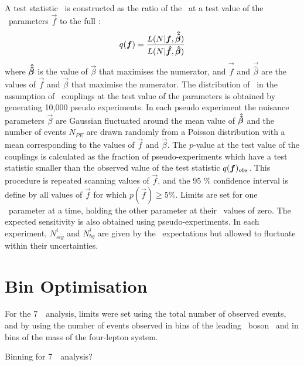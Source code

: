 A test statistic \teststat\ is constructed as the ratio of the \maxprofilellh\
at a test value of the \TGC\ parameters $\vec{f}$ to the full \maxprofilellh:
\begin{equation}
q(\boldsymbol{f}) =
\frac{L(N|\boldsymbol{f},\boldsymbol{\hat{\hat{\beta}}})}{L(N|\boldsymbol{\hat{f}},\boldsymbol{\hat{\beta}})}
\end{equation}
where $\boldsymbol{\hat{\hat{\beta}}}$ is the value of $\vec{\beta}$ that maximises the
numerator, and $\vec{\hat{f}}$ and $\vec{\hat{\beta}}$ are the values of
$\vec{f}$ and $\vec{\beta}$ that maximise the numerator. The distribution of
\teststat\ in the assumption of \TGC\ couplings at the test value of the
parameters is obtained by generating 10,000 pseudo experiments. In each
pseudo experiment the nuisance parameters $\vec{\beta}$ are Gaussian
fluctuated around the mean value of $\boldsymbol{\hat{\hat{\beta}}}$ and the number of events
$N_{PE}$ are drawn randomly from a Poisson distribution with a mean corresponding to the
values of $\vec{f}$ and $\vec{\beta}$. The $p$-value at the test value of the
couplings is calculated as the fraction of pseudo-experiments which have a test
statistic smaller than the observed value of the test statistic $q(\boldsymbol{f})_{obs}$.
This procedure is repeated scanning values of $\vec{f}$, and the 95 \%
confidence interval is define by all values of $\vec{f}$ for which
$p(\vec{f})\geq 5\%$. Limits are set for one \TGC\ parameter at a time, holding
the other parameter at their \sm\ values of zero. The expected sensitivity is
also obtained using pseudo-experiments. In each
experiment, $N^{i}_{sig}$ and $N^{i}_{bg}$ are given by the \sm\ expectations but
allowed to fluctuate within their uncertainties.

\section{Bin Optimisation}

For the 7~\tev\ analysis, limits were set using the total number of observed
events, and by using the number of events observed in bins of the leading \Z\
boson \pt\ and in bins of the mass of the four-lepton system. 

Binning for 7~\tev\ analysis?

